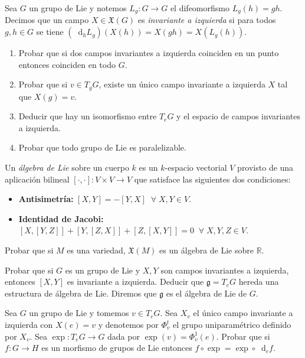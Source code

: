\documentclass[12pt, a4paper]{amsart}
\theoremstyle{definition}
\newcommand{\RR}{\mathbb{R}}      %
\newcommand*\diff{\mathop{}\!\mathrm{d}}
\begin{document}
\begin{question}
Sea $G$ un grupo de Lie y notemos $L_g:G\to G$ el difeomorfismo $L_g(h)=gh$. Decimos que un campo $X\in\mathfrak{X}(G)$ es \textit{invariante a izquierda} si para todos $g,h\in G$ se tiene $(\diff_h L_g)(X(h)) = X(gh) = X(L_g(h))$.
\begin{enumerate}[label=\textbf{\alph*.}]
\item Probar que si dos campos invariantes a izquierda coinciden en un punto entonces coinciden en todo $G$.
\item Probar que si $v\in T_gG$, existe un único campo invariante a izquierda $X$ tal que $X(g)=v$.
\item Deducir que hay un isomorfismo entre $T_eG$ y el espacio de campos invariantes a izquierda.
\item Probar que todo grupo de Lie es paralelizable.
\end{enumerate}
\end{question}

\begin{question}
Un \textit{álgebra de Lie} sobre un cuerpo $k$ es un $k$-espacio vectorial $V$ provisto de una aplicación bilineal $[\cdot,\cdot]:V\times V\to V$ que satisface las siguientes dos condiciones:
\begin{itemize}
\item \textbf{Antisimetría:} $[X,Y] = -[Y,X]\;\; \forall\;X,Y\in V$.
\item \textbf{Identidad de Jacobi:} $[X,[Y,Z]]+[Y,[Z,X]] + [Z,[X,Y]]=0 \;\;\forall\;X,Y,Z\in V$.
\end{itemize}
Probar que si $M$ es una variedad, $\mathfrak{X}(M)$ es un álgebra de Lie sobre $\RR$.
\end{question}

\begin{question}
Probar que si $G$ es un grupo de Lie y $X,Y$ son campos invariantes a izquierda, entonces $[X,Y]$ es invariante a izquierda. Deducir que $\mathfrak{g}=T_eG$ hereda una estructura de álgebra de Lie.	Diremos que $\mathfrak{g}$ es el álgebra de Lie de $G$.
\end{question}

\begin{question}
Sea $G$ un grupo de Lie y tomemos $v\in T_eG$. Sea $X_v$ el único campo invariante a izquierda con $X(e)=v$ y denotemos por $\Phi_v^t$ el grupo uniparamétrico definido por $X_v$. Sea $\exp:T_eG\to G$ dada por $\exp(v)=\Phi_v^1(e)$. Probar que si $f:G\to H$ es un morfismo de grupos de Lie entonces $f\circ\exp = \exp\circ \diff_e f$.
\end{question}
\end{document}
